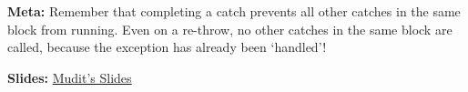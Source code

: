 \begin{blocksection}
\begin{solution}
\textbf{Meta:} Remember that completing a catch prevents all other catches
in the same block from running. Even on a re-throw, no other catches in the
same block are called, because the exception has already been `handled'!

\textbf{Slides:}
\href{https://docs.google.com/presentation/d/1j418bduZS2Ltm6dVVg-b3WpGbOGrRUm6DKRkZCByuaQ/edit?usp=sharing}
     {Mudit's Slides}
\end{solution}
\end{blocksection}
